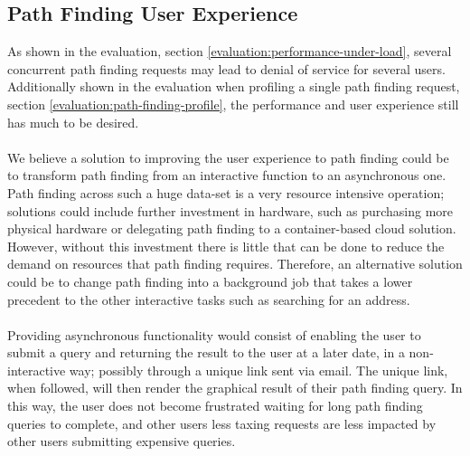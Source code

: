 \subsection{Path Finding User Experience}\label{future-work:path-finding}
As shown in the evaluation, section \ref{evaluation:performance-under-load}, several concurrent path finding requests may lead to denial of service for several users. Additionally shown in the evaluation when profiling a single path finding request, section \ref{evaluation:path-finding-profile}, the performance and user experience still has much to be desired. 
\\\\
We believe a solution to improving the user experience to path finding could be to transform path finding from an interactive function to an asynchronous one. Path finding across such a huge data-set is a very resource intensive operation; solutions could include further investment in hardware, such as purchasing more physical hardware or delegating path finding to a container-based cloud solution. However, without this investment there is little that can be done to reduce the demand on resources that path finding requires. Therefore, an alternative solution could be to change path finding into a background job that takes a lower precedent to the other interactive tasks such as searching for an address. 
\\\\
Providing asynchronous functionality would consist of enabling the user to submit a query and returning the result to the user at a later date, in a non-interactive way; possibly through a unique link sent via email. The unique link, when followed, will then render the graphical result of their path finding query. In this way, the user does not become frustrated waiting for long path finding queries to complete, and other users less taxing requests are less impacted by other users submitting expensive queries. 

